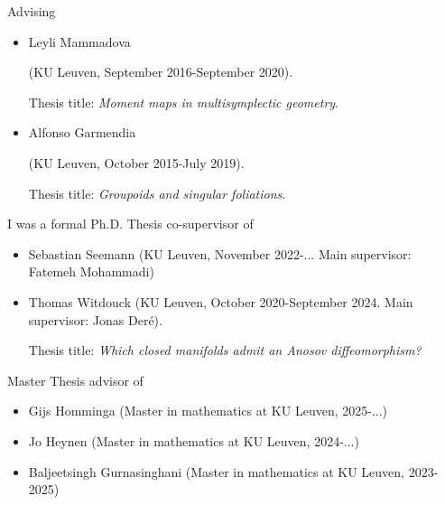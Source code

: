 \documentclass[12p]{resume}
\begin{document}
\begin{category}{Advising}
\begin{itemize}
   (KU Leuven,  supervised together with  Mauro Spera (USCS Brescia), January 2017-April 2020). 
   
 Thesis title:  \emph{Homotopy comoment maps in multisymplectic geometry}
 
   \item Leyli Mammadova
   
    (KU Leuven, September 2016-September 2020).
   
   Thesis title: \emph{Moment maps in multisymplectic geometry}.
   
   \item Alfonso Garmendia 
   
   (KU Leuven, October 2015-July 2019).
   
   Thesis title: \emph{Groupoids and singular foliations}.
\end{itemize}


\citemnobullet I was a formal Ph.D. Thesis co-supervisor of 
\begin{itemize}



 \item Sebastian Seemann (KU Leuven, November 2022-... Main supervisor: Fatemeh Mohammadi)
 
 
 \item Thomas Witdouck (KU Leuven, October 2020-September 2024.   Main supervisor: Jonas Der\'e). 
 
  Thesis title: \emph{Which closed manifolds admit an Anosov diffeomorphism?}
  
  
\end{itemize}



\citemnobullet Master Thesis advisor of 
\begin{itemize} 



\item Gijs Homminga (Master in mathematics at KU Leuven, 2025-...)

\item Jo Heynen (Master in mathematics at KU Leuven, 2024-...)


\item Baljeetsingh Gurnasinghani (Master in mathematics at KU Leuven, 2023-2025)


\end{itemize}
\end{category}
\end{document}
